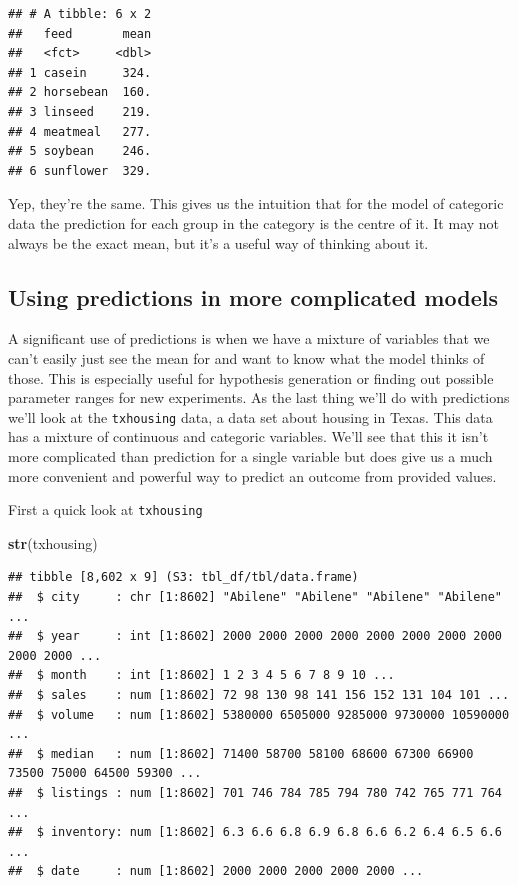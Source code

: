 \documentclass[
]{book}
\newenvironment{Shaded}{\begin{snugshade}}{\end{snugshade}}
\newcommand{\KeywordTok}[1]{\textcolor[rgb]{0.13,0.29,0.53}{\textbf{#1}}}
\newcommand{\NormalTok}[1]{#1}
\begin{document}
\begin{verbatim}
## # A tibble: 6 x 2
##   feed       mean
##   <fct>     <dbl>
## 1 casein     324.
## 2 horsebean  160.
## 3 linseed    219.
## 4 meatmeal   277.
## 5 soybean    246.
## 6 sunflower  329.
\end{verbatim}

Yep, they're the same. This gives us the intuition that for the model of categoric data the prediction for each group in the category is the centre of it. It may not always be the exact mean, but it's a useful way of thinking about it.

\hypertarget{using-predictions-in-more-complicated-models}{%
\subsection{Using predictions in more complicated models}\label{using-predictions-in-more-complicated-models}}

A significant use of predictions is when we have a mixture of variables that we can't easily just see the mean for and want to know what the model thinks of those. This is especially useful for hypothesis generation or finding out possible parameter ranges for new experiments. As the last thing we'll do with predictions we'll look at the \texttt{txhousing} data, a data set about housing in Texas. This data has a mixture of continuous and categoric variables. We'll see that this it isn't more complicated than prediction for a single variable but does give us a much more convenient and powerful way to predict an outcome from provided values.

First a quick look at \texttt{txhousing}

\begin{Shaded}
\begin{Highlighting}[]
\KeywordTok{str}\NormalTok{(txhousing)}
\end{Highlighting}
\end{Shaded}

\begin{verbatim}
## tibble [8,602 x 9] (S3: tbl_df/tbl/data.frame)
##  $ city     : chr [1:8602] "Abilene" "Abilene" "Abilene" "Abilene" ...
##  $ year     : int [1:8602] 2000 2000 2000 2000 2000 2000 2000 2000 2000 2000 ...
##  $ month    : int [1:8602] 1 2 3 4 5 6 7 8 9 10 ...
##  $ sales    : num [1:8602] 72 98 130 98 141 156 152 131 104 101 ...
##  $ volume   : num [1:8602] 5380000 6505000 9285000 9730000 10590000 ...
##  $ median   : num [1:8602] 71400 58700 58100 68600 67300 66900 73500 75000 64500 59300 ...
##  $ listings : num [1:8602] 701 746 784 785 794 780 742 765 771 764 ...
##  $ inventory: num [1:8602] 6.3 6.6 6.8 6.9 6.8 6.6 6.2 6.4 6.5 6.6 ...
##  $ date     : num [1:8602] 2000 2000 2000 2000 2000 ...
\end{verbatim}
\end{document}
